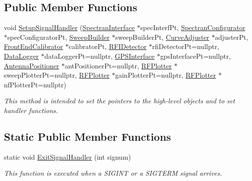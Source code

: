 \subsection*{Public Member Functions}
\begin{DoxyCompactItemize}
\item 
\mbox{\label{classSignalHandler_a9d6599351f7c8b007410145cb23f18f4}} 
void \hyperlink{classSignalHandler_a9d6599351f7c8b007410145cb23f18f4}{Setup\+Signal\+Handler} (\hyperlink{classSpectranInterface}{Spectran\+Interface} $\ast$spec\+Interf\+Pt, \hyperlink{classSpectranConfigurator}{Spectran\+Configurator} $\ast$spec\+Configurator\+Pt, \hyperlink{classSweepBuilder}{Sweep\+Builder} $\ast$sweep\+Builder\+Pt, \hyperlink{classCurveAdjuster}{Curve\+Adjuster} $\ast$adjuster\+Pt, \hyperlink{classFrontEndCalibrator}{Front\+End\+Calibrator} $\ast$calibrator\+Pt, \hyperlink{classRFIDetector}{R\+F\+I\+Detector} $\ast$rfi\+Detector\+Pt=nullptr, \hyperlink{classDataLogger}{Data\+Logger} $\ast$data\+Logger\+Pt=nullptr, \hyperlink{classGPSInterface}{G\+P\+S\+Interface} $\ast$gps\+Interface\+Pt=nullptr, \hyperlink{classAntennaPositioner}{Antenna\+Positioner} $\ast$ant\+Positioner\+Pt=nullptr, \hyperlink{classRFPlotter}{R\+F\+Plotter} $\ast$sweep\+Plotter\+Pt=nullptr, \hyperlink{classRFPlotter}{R\+F\+Plotter} $\ast$gain\+Plotter\+Pt=nullptr, \hyperlink{classRFPlotter}{R\+F\+Plotter} $\ast$nf\+Plotter\+Pt=nullptr)
\begin{DoxyCompactList}\small\item\em This method is intended to set the pointers to the high-\/level objects and to set handler functions. \end{DoxyCompactList}\end{DoxyCompactItemize}
\subsection*{Static Public Member Functions}
\begin{DoxyCompactItemize}
\item 
static void \hyperlink{classSignalHandler_af32b7213b43fd13fa12587a0c0d9b565}{Exit\+Signal\+Handler} (int signum)
\begin{DoxyCompactList}\small\item\em This function is executed when a S\+I\+G\+I\+NT or a S\+I\+G\+T\+E\+RM signal arrives. \end{DoxyCompactList}\end{DoxyCompactItemize}
